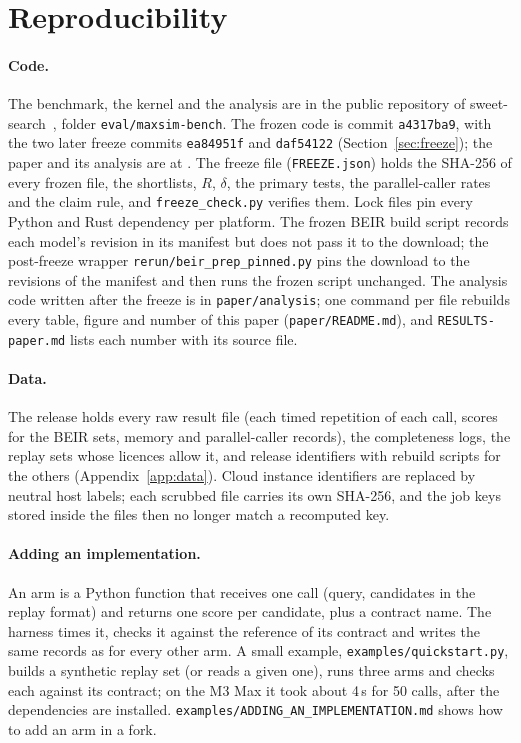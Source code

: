 \section{Reproducibility}
\label{sec:repro}

\paragraph{Code.}
The benchmark, the kernel and the analysis are in the public repository of sweet-search~\cite{sweetsearch_repo}, folder \texttt{eval/maxsim-bench}.
The frozen code is commit \texttt{a4317ba9}, with the two later freeze commits \texttt{ea84951f} and \texttt{daf54122} (Section~\ref{sec:freeze}); the paper and its analysis are at . The freeze file (\texttt{FREEZE.json}) holds the SHA-256 of every frozen file, the shortlists, $R$, $\delta$, the primary tests, the parallel-caller rates and the claim rule, and \texttt{freeze\_check.py} verifies them.
Lock files pin every Python and Rust dependency per platform. The frozen BEIR build script records each model's revision in its manifest but does not pass it to the download; the post-freeze wrapper \texttt{rerun/beir\_prep\_pinned.py} pins the download to the revisions of the manifest and then runs the frozen script unchanged.
The analysis code written after the freeze is in \texttt{paper/analysis}; one command per file rebuilds every table, figure and number of this paper (\texttt{paper/README.md}), and \texttt{RESULTS-paper.md} lists each number with its source file.

\paragraph{Data.}
The release  holds every raw result file (each timed repetition of each call, scores for the BEIR sets, memory and parallel-caller records), the completeness logs, the replay sets whose licences allow it, and release identifiers with rebuild scripts for the others (Appendix~\ref{app:data}).
Cloud instance identifiers are replaced by neutral host labels; each scrubbed file carries its own SHA-256, and the job keys stored inside the files then no longer match a recomputed key.

\paragraph{Adding an implementation.}
An arm is a Python function that receives one call (query, candidates in the replay format) and returns one score per candidate, plus a contract name.
The harness times it, checks it against the reference of its contract and writes the same records as for every other arm.
A small example, \texttt{examples/quickstart.py}, builds a synthetic replay set (or reads a given one), runs three arms and checks each against its contract; on the M3 Max it took about 4\,s for 50 calls, after the dependencies are installed. \texttt{examples/ADDING\_AN\_IMPLEMENTATION.md} shows how to add an arm in a fork.
